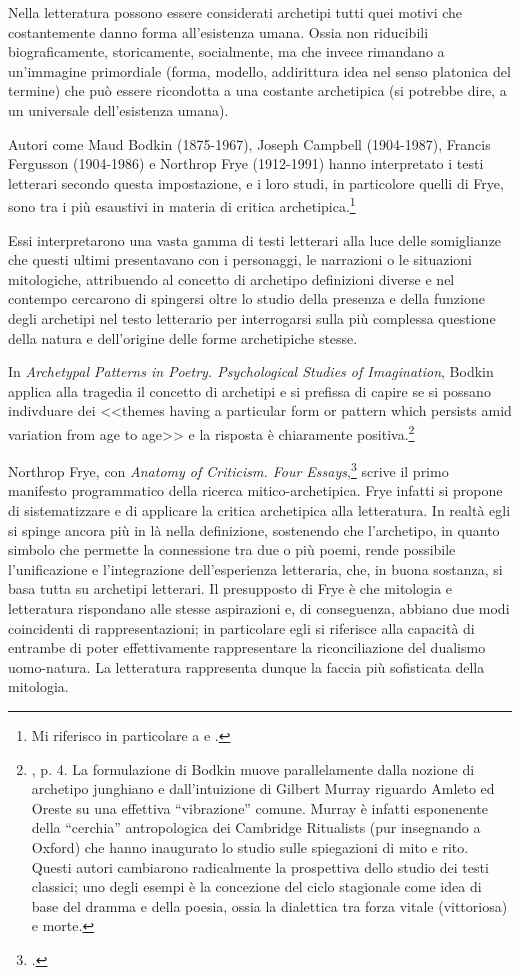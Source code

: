 \documentclass[12pt,a4paper,openright, oneside]{book}
\begin{document}
Nella letteratura possono essere considerati archetipi tutti quei motivi che costantemente danno forma all'esistenza umana. Ossia non riducibili biograficamente, storicamente, socialmente, ma che invece rimandano a un'immagine primordiale (forma, modello, addirittura idea nel senso platonica del termine) che può essere ricondotta a una costante archetipica (si potrebbe dire, a un universale dell'esistenza umana).

Autori come Maud Bodkin (1875-1967), Joseph Campbell (1904-1987),  Francis Fergusson (1904-1986) e Northrop Frye (1912-1991) hanno interpretato i testi letterari secondo questa impostazione, e i loro studi, in particolore quelli di Frye, sono tra i più esaustivi in materia di critica archetipica.\footnote{Mi riferisco in particolare a \cite{Bodkin} e \cite{Frye}.}

Essi interpretarono una vasta gamma di testi letterari alla luce delle somiglianze che questi ultimi presentavano con i personaggi, le narrazioni o le situazioni mitologiche, attribuendo al concetto di archetipo definizioni diverse e nel contempo cercarono di spingersi oltre lo studio della presenza e della funzione degli archetipi nel testo letterario per interrogarsi sulla più complessa questione della natura e dell’origine delle forme archetipiche stesse.

 In \textit{Archetypal Patterns in Poetry. Psychological Studies of Imagination}, Bodkin applica alla tragedia il concetto di archetipi  e si prefissa di capire se si possano indivduare dei <<themes having a particular form or pattern which persists amid variation from age to age>> e la risposta è chiaramente positiva.\footnote{\cite{Bodkin}, p. 4. La formulazione di Bodkin muove parallelamente dalla nozione di archetipo junghiano e dall'intuizione di Gilbert Murray riguardo Amleto ed Oreste su una effettiva ``vibrazione'' comune. Murray è infatti esponenente della ``cerchia'' antropologica dei Cambridge Ritualists (pur insegnando a Oxford) che hanno inaugurato lo studio sulle spiegazioni di mito e rito. Questi autori cambiarono radicalmente la prospettiva dello studio dei testi classici; uno degli esempi è la concezione del ciclo stagionale come idea di base del dramma e della poesia, ossia la dialettica tra forza vitale (vittoriosa) e morte.}




Northrop Frye, con \textit{Anatomy of Criticism. Four Essays},\footcite{Frye} scrive il primo manifesto programmatico della ricerca mitico-archetipica. Frye infatti si propone di sistematizzare e di applicare la critica archetipica alla letteratura. In realtà egli si spinge ancora più in là nella definizione, sostenendo che l'archetipo, in quanto simbolo che permette la connessione tra due o più poemi, rende possibile l'unificazione e l'integrazione dell'esperienza letteraria, che, in buona sostanza, si basa tutta su archetipi letterari. Il presupposto di Frye è che mitologia e letteratura rispondano alle stesse aspirazioni e, di conseguenza, abbiano due modi coincidenti di rappresentazioni; in particolare egli si riferisce alla capacità di entrambe di poter effettivamente rappresentare la riconciliazione del dualismo uomo-natura. La letteratura rappresenta dunque la faccia più sofisticata della mitologia.
\end{document}
